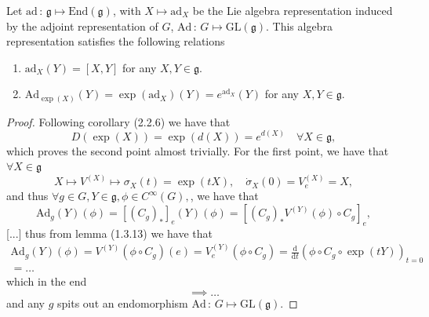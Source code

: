 \begin{corollary}
    Let \(\mathrm{ad} \,:\, \mathfrak{g} \mapsto \mathrm{End}(\mathfrak{g}) \), with \(X \mapsto \mathrm{ad}_X \) be the Lie algebra representation induced by the adjoint representation of \(G\), \(\mathrm{Ad}\,:\, G \mapsto \mathrm{GL}(\mathfrak{g}) \). This algebra representation satisfies the following relations
    \begin{enumerate}
        \item \(\mathrm{ad}_X (Y) = [X, Y] \) for any \(X, Y \in \mathfrak{g}\).
        \item \(\mathrm{Ad}_{\exp(X)} (Y)= \exp(\mathrm{ad}_X)(Y) = e^{\mathrm{ad}_X } (Y)\) for any \(X, Y \in \mathfrak{g}\).
    \end{enumerate}
\end{corollary}
\begin{proof}
    Following corollary (2.2.6) we have that
    \[
        D(\exp(X)) = \exp(d(X)) = e^{d(X)} \quad \forall X \in \mathfrak{g},
    \]
    which proves the second point almost trivially. For the first point, we have that \(\forall X \in \mathfrak{g}\)
    \[
        X \mapsto V^{(X)} \mapsto \sigma_X(t) = \exp(tX), \quad \dot{\sigma}_X(0) = V^{(X)}_e = X,
    \]
    and thus \(\forall g \in G, Y \in \mathfrak{g}, \phi \in C^{\infty}(G),\), we have that
    \[
        \mathrm{Ad}_g (Y)(\phi) = [(C_g)_*]_e (Y)(\phi) = [(C_g)_* V^{(Y)}(\phi) \circ C_g]_e,
    \]
    [...]
    thus from lemma (1.3.13) we have that
    \[
        \begin{aligned}
            \mathrm{Ad}_g (Y)(\phi) = V^{(Y)}(\phi \circ C_g)(e) = V^{(Y)}_e(\phi \circ C_g) = \frac{\mathrm{d}}{\mathrm{d} t} (\phi \circ C_g \circ \exp(tY))_{t=0} \\
            = \dots
        \end{aligned}
    \]
    which in the end
    \[
        \implies \dots
    \]
    and any \(g\) spits out an endomorphism \(\mathrm{Ad} \,:\, G \mapsto \mathrm{GL}(\mathfrak{g}) \).


\end{proof}
